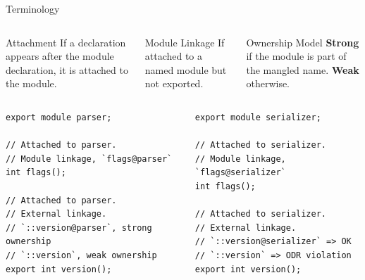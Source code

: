 \documentclass[aspectratio=169]{beamer}
\begin{document}
\begin{frame}[t,fragile]{Terminology}

  \begin{columns}[t]
    \begin{column}{0.3\textwidth}
      \begin{block}{\footnotesize Attachment}
        \justifying \footnotesize If a declaration appears after the module declaration, it is attached to the module.
      \end{block}
    \end{column}

    \begin{column}{0.3\textwidth}
      \begin{block}{\footnotesize Module Linkage}
        \justifying   \footnotesize If attached to a named module but not exported.
      \end{block}
    \end{column}

    \begin{column}{0.3\textwidth}
      \begin{block}{\footnotesize Ownership Model}
        \justifying \footnotesize \textbf{Strong} if the module is part of the mangled name. \textbf{Weak} otherwise.
      \end{block}
    \end{column}
  \end{columns}

  \vspace{0.5em}

  \begin{columns}
    \begin{column}{0.5\textwidth}
      \begin{verbatim}
export module parser;

// Attached to parser.
// Module linkage, `flags@parser`
int flags();

// Attached to parser.
// External linkage.
// `::version@parser`, strong ownership
// `::version`, weak ownership
export int version();
\end{verbatim}
    \end{column}
    \begin{column}{0.5\textwidth}
      \begin{verbatim}
export module serializer;

// Attached to serializer.
// Module linkage, `flags@serializer`
int flags();

// Attached to serializer.
// External linkage.
// `::version@serializer` => OK
// `::version` => ODR violation
export int version();
  \end{verbatim}
    \end{column}
  \end{columns}
\end{frame}
\end{document}
